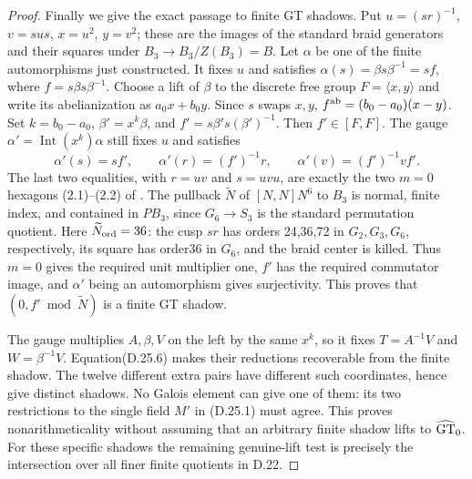 \begin{proof}
Finally we give the exact passage to finite GT shadows.
Put $u=(sr)^{-1}$, $v=sus$, $x=u^2$, $y=v^2$; these are
the images of the standard braid generators and their
squares under $B_3\to B_3/Z(B_3)=B$.
Let $\alpha$ be one of the finite automorphisms just constructed.
It fixes $u$ and satisfies
$\alpha(s)=\beta s\beta^{-1}=sf$, where
$f=s\beta s\beta^{-1}$. Choose a lift of $\beta$ to the
discrete free group $F=\langle x,y\rangle$ and write its
abelianization as $a_0x+b_0y$. Since $s$ swaps $x,y$,
$f^{\rm ab}=(b_0-a_0)(x-y)$.
Set $k=b_0-a_0$, $\beta'=x^k\beta$, and
$f'=s\beta's(\beta')^{-1}$. Then $f'\in[F,F]$.
The gauge $\alpha'=\operatorname{Int}(x^k)\alpha$ still
fixes $u$ and satisfies
\[
 \alpha'(s)=sf',\qquad\alpha'(r)=(f')^{-1}r,
 \qquad\alpha'(v)=(f')^{-1}vf'.                           \tag{D.25.7}
\]
The last two equalities, with $r=uv$ and $s=uvu$, are
exactly the two $m=0$ hexagons (2.1)--(2.2) of
\cite[Definitions2.1 and2.3]{dBDHP2026}.
The pullback $\widetilde N$ of $[N,N]N^6$ to $B_3$ is
normal, finite index, and contained in $PB_3$, since
$G_6\to S_3$ is the standard permutation quotient.
Here $\widetilde N_{\rm ord}=36$: the cusp $sr$ has orders
24,36,72 in $G_2,G_3,G_6$, respectively, its square has
order36 in $G_6$, and the braid center is killed.
Thus $m=0$ gives the required unit multiplier one,
$f'$ has the required commutator image, and $\alpha'$ being
an automorphism gives surjectivity. This proves that
$(0,f'\bmod\widetilde N)$ is a finite GT shadow.

The gauge multiplies $A,\beta,V$ on the left by the same
$x^k$, so it fixes $T=A^{-1}V$ and $W=\beta^{-1}V$.
Equation(D.25.6) makes their reductions recoverable from
the finite shadow. The twelve different extra pairs have
different such coordinates, hence give distinct shadows.
No Galois element can give one of them: its two restrictions
to the single field $M'$ in (D.25.1) must agree. This proves
nonarithmeticality without assuming that an arbitrary
finite shadow lifts to $\widehat{\rm GT}_0$.
For these specific shadows the remaining genuine-lift
test is precisely the intersection over all finer finite
quotients in D.22.
\end{proof}
